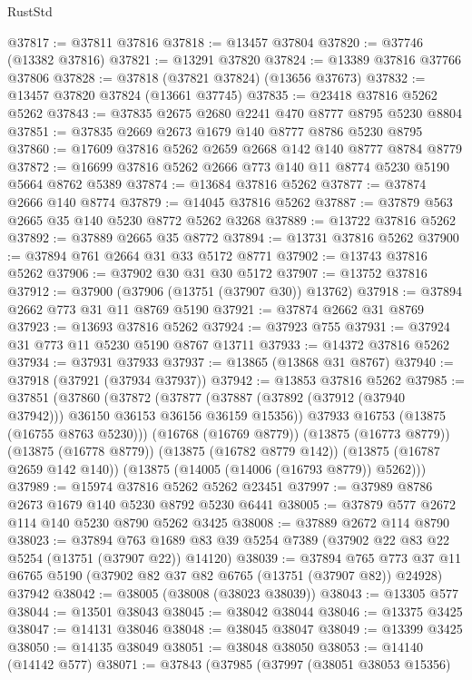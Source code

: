 \begin{lexlean}{RustStd}
\begin{coremodule}
@37817 := @37811 @37816
@37818 := @13457 @37804
@37820 := @37746 (@13382 @37816)
@37821 := @13291 @37820
@37824 := @13389 @37816 @37766 @37806
@37828 := @37818 (@37821 @37824) (@13656 @37673)
@37832 := @13457 @37820 @37824 (@13661 @37745)
@37835 := @23418 @37816 @5262 @5262
@37843 := @37835 @2675 @2680 @2241 @470 @8777 @8795 @5230 @8804
@37851 := @37835 @2669 @2673 @1679 @140 @8777 @8786 @5230 @8795
@37860 := @17609 @37816 @5262 @2659 @2668 @142 @140 @8777 @8784 @8779
@37872 := @16699 @37816 @5262 @2666 @773 @140 @11 @8774 @5230 @5190 @5664 @8762 @5389
@37874 := @13684 @37816 @5262
@37877 := @37874 @2666 @140 @8774
@37879 := @14045 @37816 @5262
@37887 := @37879 @563 @2665 @35 @140 @5230 @8772 @5262 @3268
@37889 := @13722 @37816 @5262
@37892 := @37889 @2665 @35 @8772
@37894 := @13731 @37816 @5262
@37900 := @37894 @761 @2664 @31 @33 @5172 @8771
@37902 := @13743 @37816 @5262
@37906 := @37902 @30 @31 @30 @5172
@37907 := @13752 @37816
@37912 := @37900 (@37906 (@13751 (@37907 @30)) @13762)
@37918 := @37894 @2662 @773 @31 @11 @8769 @5190
@37921 := @37874 @2662 @31 @8769
@37923 := @13693 @37816 @5262
@37924 := @37923 @755
@37931 := @37924 @31 @773 @11 @5230 @5190 @8767 @13711
@37933 := @14372 @37816 @5262
@37934 := @37931 @37933
@37937 := @13865 (@13868 @31 @8767)
@37940 := @37918 (@37921 (@37934 @37937))
@37942 := @13853 @37816 @5262
@37985 := @37851
    (@37860
      (@37872
        (@37877 (@37887 (@37892 (@37912 (@37940 @37942))) @36150 @36153 @36156 @36159 @15356))
        @37933
        @16753
        (@13875 (@16755 @8763 @5230)))
      (@16768 (@16769 @8779))
      (@13875 (@16773 @8779))
      (@13875 (@16778 @8779))
      (@13875 (@16782 @8779 @142))
      (@13875 (@16787 @2659 @142 @140))
      (@13875 (@14005 (@14006 (@16793 @8779)) @5262)))
@37989 := @15974 @37816 @5262 @5262 @23451
@37997 := @37989 @8786 @2673 @1679 @140 @5230 @8792 @5230 @6441
@38005 := @37879 @577 @2672 @114 @140 @5230 @8790 @5262 @3425
@38008 := @37889 @2672 @114 @8790
@38023 := @37894
    @763
    @1689
    @83
    @39
    @5254
    @7389
    (@37902 @22 @83 @22 @5254 (@13751 (@37907 @22)) @14120)
@38039 := @37894
    @765
    @773
    @37
    @11
    @6765
    @5190
    (@37902 @82 @37 @82 @6765 (@13751 (@37907 @82)) @24928)
    @37942
@38042 := @38005 (@38008 (@38023 @38039))
@38043 := @13305 @577
@38044 := @13501 @38043
@38045 := @38042 @38044
@38046 := @13375 @3425
@38047 := @14131 @38046
@38048 := @38045 @38047
@38049 := @13399 @3425
@38050 := @14135 @38049
@38051 := @38048 @38050
@38053 := @14140 (@14142 @577)
@38071 := @37843
    (@37985
      (@37997
        (@38051 @38053 @15356)

\end{coremodule}
\end{lexlean}
